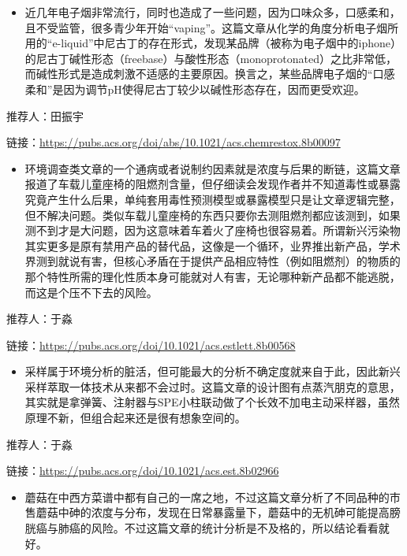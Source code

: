 \documentclass[
]{book}
\providecommand{\tightlist}{%
  \setlength{\itemsep}{0pt}\setlength{\parskip}{0pt}}
\begin{document}
\begin{itemize}
\tightlist
\item
  近几年电子烟非常流行，同时也造成了一些问题，因为口味众多，口感柔和，且不受监管，很多青少年开始``vaping''。这篇文章从化学的角度分析电子烟所用的``e-liquid''中尼古丁的存在形式，发现某品牌（被称为电子烟中的iphone）的尼古丁碱性形态（freebase）与酸性形态（monoprotonated）之比非常低，而碱性形式是造成刺激不适感的主要原因。换言之，某些品牌电子烟的``口感柔和''是因为调节pH使得尼古丁较少以碱性形态存在，因而更受欢迎。
\end{itemize}

推荐人：田振宇

链接：\url{https://pubs.acs.org/doi/abs/10.1021/acs.chemrestox.8b00097}

\begin{itemize}
\tightlist
\item
  环境调查类文章的一个通病或者说制约因素就是浓度与后果的断链，这篇文章报道了车载儿童座椅的阻燃剂含量，但仔细读会发现作者并不知道毒性或暴露究竟产生什么后果，单纯套用毒性预测模型或暴露模型只是让文章逻辑完整，但不解决问题。类似车载儿童座椅的东西只要你去测阻燃剂都应该测到，如果测不到才是大问题，因为这意味着车着火了座椅也很容易着。所谓新兴污染物其实更多是原有禁用产品的替代品，这像是一个循环，业界推出新产品，学术界测到就说有害，但核心矛盾在于提供产品相应特性（例如阻燃剂）的物质的那个特性所需的理化性质本身可能就对人有害，无论哪种新产品都不能逃脱，而这是个压不下去的风险。
\end{itemize}

推荐人：于淼

链接：\url{https://pubs.acs.org/doi/10.1021/acs.estlett.8b00568}

\begin{itemize}
\tightlist
\item
  采样属于环境分析的脏活，但可能最大的分析不确定度就来自于此，因此新兴采样萃取一体技术从来都不会过时。这篇文章的设计图有点蒸汽朋克的意思，其实就是拿弹簧、注射器与SPE小柱联动做了个长效不加电主动采样器，虽然原理不新，但组合起来还是很有想象空间的。
\end{itemize}

推荐人：于淼

链接：\url{https://pubs.acs.org/doi/10.1021/acs.est.8b02966}

\begin{itemize}
\tightlist
\item
  蘑菇在中西方菜谱中都有自己的一席之地，不过这篇文章分析了不同品种的市售蘑菇中砷的浓度与分布，发现在日常暴露量下，蘑菇中的无机砷可能提高膀胱癌与肺癌的风险。不过这篇文章的统计分析是不及格的，所以结论看看就好。
\end{itemize}
\end{document}
